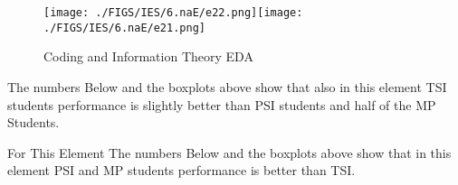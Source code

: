\documentclass[12pt]{extreport}
\begin{document}
\begin{figure}[H]
	\centering
	\texttt{[image: ./FIGS/IES/6.naE/e22.png]}\texttt{[image: ./FIGS/IES/6.naE/e21.png]}
	\caption{Coding and Information Theory EDA}
	\label{fig:73}
\end{figure}

The numbers Below and the boxplots above show that also in this element  TSI students performance is slightly better than PSI students and half of the MP Students.

For This Element The numbers Below and the boxplots above show that in this element  PSI and MP students performance is  better than TSI.

\begin{comment}
\subparagraph{Interpretation of the Box-plots:}
For This Element 




\begin{enumerate}	
	\item The MP Class Box-Plot:
	\begin{enumerate}
		\item MAX = a {} {} {} {} {} {} {} {} UQ = b {} {} {} {} {} {} {} {} Median = c
		\item LQ = d {} {} {} {} {} {} {} {}  MIN =	l {} {} {} {} {} {} {} {}  IQR = e - f = g
	\end{enumerate}
	\item The PSI Class Box-Plot:
	\begin{enumerate}
		\item MAX = a {} {} {} {} {} {} {} {} UQ = b {} {} {} {} {} {} {} {} Median = c
		\item LQ = d {} {} {} {} {} {} {} {}  MIN =	e {} {} {} {} {} {} {} {} IQR = f - g = h	
	\end{enumerate}
	\item The TSI Class Box-Plot:
	\begin{enumerate}
		\item MAX = a {} {} {} {} {} {} {} {} UQ = b {} {} {} {} {} {} {} {} Median = c
		\item LQ = d {} {} {} {} {} {} {} {} MIN = e {} {} {} {} {} {} {} {} IQR = f - g = h	
	\end{enumerate}
\end{enumerate}



\subparagraph{Interpretation of the histogram:}
This Frequency Distribution is (Skeness) with the following descriptive statistics:
\begin{enumerate}
	\item Mean = 
	\item STD = 
	\item Range = a - b = c
	\item IQR = a-b = c 
\end{enumerate}

\end{comment}
\end{document}
